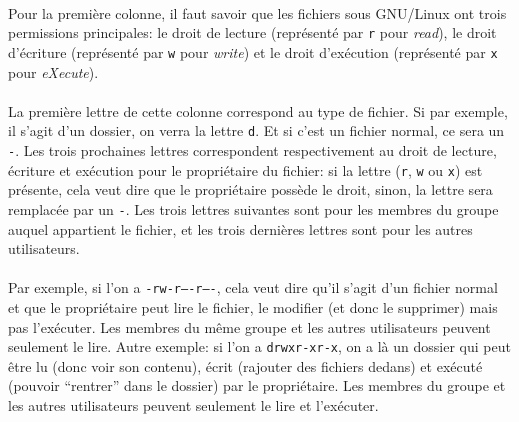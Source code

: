 \paragraph{} Pour la première colonne, il faut savoir que les fichiers sous
GNU/Linux ont trois permissions principales: le droit de lecture (représenté
par \texttt{r} pour \emph{read}), le droit d'écriture (représenté par
\texttt{w} pour \emph{write}) et le droit d'exécution (représenté par
\texttt{x} pour \emph{eXecute}).

\paragraph{} La première lettre de cette colonne correspond au type de fichier.
Si par exemple, il s'agit d'un dossier, on verra la lettre \texttt{d}.  Et si
c'est un fichier normal, ce sera un \texttt{-}. Les trois prochaines lettres
correspondent respectivement au droit de lecture, écriture et exécution pour le
propriétaire du fichier: si la lettre (\texttt{r}, \texttt{w} ou \texttt{x})
est présente, cela veut dire que le propriétaire possède le droit, sinon, la
lettre sera remplacée par un \texttt{-}. Les trois lettres suivantes sont pour
les membres du groupe auquel appartient le fichier, et les trois dernières
lettres sont pour les autres utilisateurs.

\paragraph{} Par exemple, si l'on a \texttt{-rw-r----r----}, cela veut dire
qu'il s'agit d'un fichier normal et que le propriétaire peut lire le fichier,
le modifier (et donc le supprimer) mais pas l'exécuter. Les membres du même
groupe et les autres utilisateurs peuvent seulement le lire. Autre exemple: si
l'on a \texttt{drwxr-xr-x}, on a là un dossier qui peut être lu (donc voir son
contenu), écrit (rajouter des fichiers dedans) et exécuté (pouvoir ``rentrer''
dans le dossier) par le propriétaire. Les membres du groupe et les autres
utilisateurs peuvent seulement le lire et l'exécuter.
